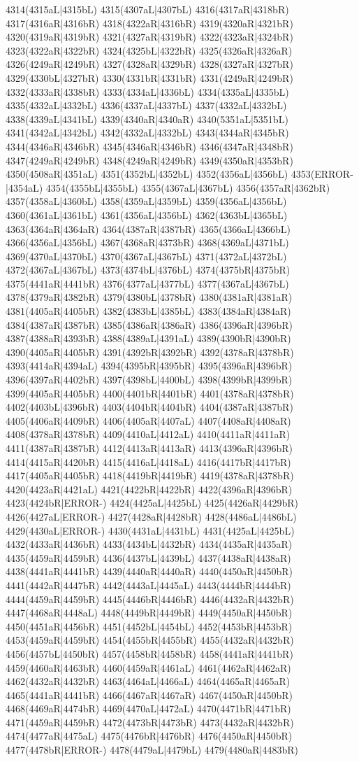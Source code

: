 4314(4315aL|4315bL) 4315(4307aL|4307bL) 4316(4317aR|4318bR) 4317(4316aR|4316bR) 4318(4322aR|4316bR) 4319(4320aR|4321bR) 4320(4319aR|4319bR) 4321(4327aR|4319bR) 4322(4323aR|4324bR) 4323(4322aR|4322bR) 4324(4325bL|4322bR) 4325(4326aR|4326aR) 4326(4249aR|4249bR) 4327(4328aR|4329bR) 4328(4327aR|4327bR) 4329(4330bL|4327bR) 4330(4331bR|4331bR) 4331(4249aR|4249bR) 4332(4333aR|4338bR) 4333(4334aL|4336bL) 4334(4335aL|4335bL) 4335(4332aL|4332bL) 4336(4337aL|4337bL) 4337(4332aL|4332bL) 4338(4339aL|4341bL) 4339(4340aR|4340aR) 4340(5351aL|5351bL) 4341(4342aL|4342bL) 4342(4332aL|4332bL) 4343(4344aR|4345bR) 4344(4346aR|4346bR) 4345(4346aR|4346bR) 4346(4347aR|4348bR) 4347(4249aR|4249bR) 4348(4249aR|4249bR) 4349(4350aR|4353bR) 4350(4508aR|4351aL) 4351(4352bL|4352bL) 4352(4356aL|4356bL) 4353(ERROR-|4354aL) 4354(4355bL|4355bL) 4355(4367aL|4367bL) 4356(4357aR|4362bR) 4357(4358aL|4360bL) 4358(4359aL|4359bL) 4359(4356aL|4356bL) 4360(4361aL|4361bL) 4361(4356aL|4356bL) 4362(4363bL|4365bL) 4363(4364aR|4364aR) 4364(4387aR|4387bR) 4365(4366aL|4366bL) 4366(4356aL|4356bL) 4367(4368aR|4373bR) 4368(4369aL|4371bL) 4369(4370aL|4370bL) 4370(4367aL|4367bL) 4371(4372aL|4372bL) 4372(4367aL|4367bL) 4373(4374bL|4376bL) 4374(4375bR|4375bR) 4375(4441aR|4441bR) 4376(4377aL|4377bL) 4377(4367aL|4367bL) 4378(4379aR|4382bR) 4379(4380bL|4378bR) 4380(4381aR|4381aR) 4381(4405aR|4405bR) 4382(4383bL|4385bL) 4383(4384aR|4384aR) 4384(4387aR|4387bR) 4385(4386aR|4386aR) 4386(4396aR|4396bR) 4387(4388aR|4393bR) 4388(4389aL|4391aL) 4389(4390bR|4390bR) 4390(4405aR|4405bR) 4391(4392bR|4392bR) 4392(4378aR|4378bR) 4393(4414aR|4394aL) 4394(4395bR|4395bR) 4395(4396aR|4396bR) 4396(4397aR|4402bR) 4397(4398bL|4400bL) 4398(4399bR|4399bR) 4399(4405aR|4405bR) 4400(4401bR|4401bR) 4401(4378aR|4378bR) 4402(4403bL|4396bR) 4403(4404bR|4404bR) 4404(4387aR|4387bR) 4405(4406aR|4409bR) 4406(4405aR|4407aL) 4407(4408aR|4408aR) 4408(4378aR|4378bR) 4409(4410aL|4412aL) 4410(4411aR|4411aR) 4411(4387aR|4387bR) 4412(4413aR|4413aR) 4413(4396aR|4396bR) 4414(4415aR|4420bR) 4415(4416aL|4418aL) 4416(4417bR|4417bR) 4417(4405aR|4405bR) 4418(4419bR|4419bR) 4419(4378aR|4378bR) 4420(4423aR|4421aL) 4421(4422bR|4422bR) 4422(4396aR|4396bR) 4423(4424bR|ERROR-) 4424(4425aL|4425bL) 4425(4426aR|4429bR) 4426(4427aL|ERROR-) 4427(4428aR|4428bR) 4428(4486aL|4486bL) 4429(4430aL|ERROR-) 4430(4431aL|4431bL) 4431(4425aL|4425bL) 4432(4433aR|4436bR) 4433(4434bL|4432bR) 4434(4435aR|4435aR) 4435(4459aR|4459bR) 4436(4437bL|4439bL) 4437(4438aR|4438aR) 4438(4441aR|4441bR) 4439(4440aR|4440aR) 4440(4450aR|4450bR) 4441(4442aR|4447bR) 4442(4443aL|4445aL) 4443(4444bR|4444bR) 4444(4459aR|4459bR) 4445(4446bR|4446bR) 4446(4432aR|4432bR) 4447(4468aR|4448aL) 4448(4449bR|4449bR) 4449(4450aR|4450bR) 4450(4451aR|4456bR) 4451(4452bL|4454bL) 4452(4453bR|4453bR) 4453(4459aR|4459bR) 4454(4455bR|4455bR) 4455(4432aR|4432bR) 4456(4457bL|4450bR) 4457(4458bR|4458bR) 4458(4441aR|4441bR) 4459(4460aR|4463bR) 4460(4459aR|4461aL) 4461(4462aR|4462aR) 4462(4432aR|4432bR) 4463(4464aL|4466aL) 4464(4465aR|4465aR) 4465(4441aR|4441bR) 4466(4467aR|4467aR) 4467(4450aR|4450bR) 4468(4469aR|4474bR) 4469(4470aL|4472aL) 4470(4471bR|4471bR) 4471(4459aR|4459bR) 4472(4473bR|4473bR) 4473(4432aR|4432bR) 4474(4477aR|4475aL) 4475(4476bR|4476bR) 4476(4450aR|4450bR) 4477(4478bR|ERROR-) 4478(4479aL|4479bL) 4479(4480aR|4483bR) 
